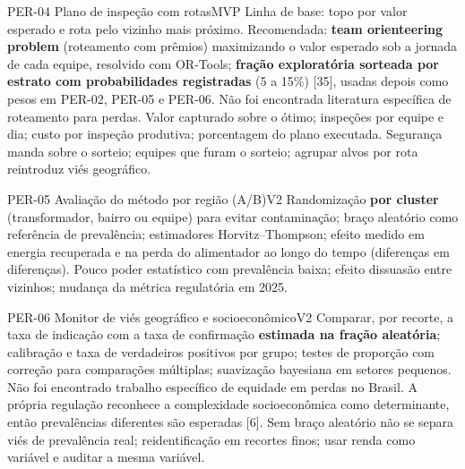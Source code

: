 \begin{ficha}{PER-04 \textperiodcentered{} Plano de inspeção com rotas}{MVP}
 Linha de base: topo por valor esperado e rota pelo vizinho
mais próximo. Recomendada: \textbf{team orienteering problem} (roteamento com
prêmios) maximizando o valor esperado sob a jornada de cada equipe, resolvido
com OR-Tools; \textbf{fração exploratória sorteada por estrato com
probabilidades registradas} (5 a 15\%) [35], usadas depois como pesos em
PER-02, PER-05 e PER-06. Não foi encontrada literatura específica de
roteamento para perdas.
 Valor capturado sobre o ótimo; inspeções por equipe e dia;
custo por inspeção produtiva; porcentagem do plano executada.
 Segurança manda sobre o sorteio; equipes que furam o
sorteio; agrupar alvos por rota reintroduz viés geográfico.
\end{ficha}

\begin{ficha}{PER-05 \textperiodcentered{} Avaliação do método por região (A/B)}{V2}
 Randomização \textbf{por cluster} (transformador, bairro
ou equipe) para evitar contaminação; braço aleatório como referência de
prevalência; estimadores Horvitz--Thompson; efeito medido em energia
recuperada e na perda do alimentador ao longo do tempo (diferenças em
diferenças).
 Pouco poder estatístico com prevalência baixa; efeito
dissuasão entre vizinhos; mudança da métrica regulatória em 2025.
\end{ficha}

\begin{ficha}{PER-06 \textperiodcentered{} Monitor de viés geográfico e socioeconômico}{V2}
 Comparar, por recorte, a taxa de indicação com a taxa de
confirmação \textbf{estimada na fração aleatória}; calibração e taxa de
verdadeiros positivos por grupo; testes de proporção com correção para
comparações múltiplas; suavização bayesiana em setores pequenos. Não foi
encontrado trabalho específico de equidade em perdas no Brasil. A própria
regulação reconhece a complexidade socioeconômica como determinante, então
prevalências diferentes são esperadas [6].
 Sem braço aleatório não se separa viés de prevalência
real; reidentificação em recortes finos; usar renda como variável e auditar
a mesma variável.
\end{ficha}

